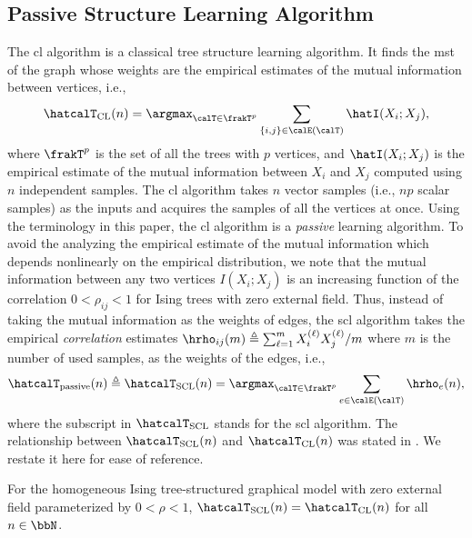 \documentclass[11pt,onecolumn]{article}
\newcommand{\Passive}{{\rm passive}}
\begin{document}
\subsection{Passive Structure Learning Algorithm}\label{sec:pasivlearn}
The \ac{cl} algorithm is a classical tree structure learning algorithm\cite{chow1968approximating}. It finds the \ac{mst} of the graph whose weights are the empirical estimates of the mutual information between vertices, i.e.,
\begin{align}
	\hatcalT_{\rm{CL}}(n)=\argmax_{\calT\in\frakT^{p}} \sum_{\{i,j\}\in\calE(\calT)} \hatI(X_{i};X_{j}),
\end{align}
where $\frakT^{p}$ is the set of all the trees with $p$ vertices, and $\hatI(X_{i};X_{j})$ is the empirical estimate of the mutual information between $X_{i}$ and $X_{j}$ computed using $n$ independent samples. The \ac{cl} algorithm takes $n$ vector samples (i.e., $np$ 
scalar samples) as the inputs and acquires the samples of all the vertices at once. Using the terminology in this paper, the \ac{cl} algorithm is a   \emph{passive} learning algorithm. To avoid the analyzing the empirical estimate 
of the mutual information which depends nonlinearly on the empirical distribution, we note that the mutual information between any two vertices $I(X_{i};X_{j})$ is an increasing function of the correlation $0<\rho_{ij}<1$ for Ising trees with zero external field. Thus, instead of taking the mutual 
information as the weights of edges, the \ac{scl} algorithm takes the empirical {\em correlation} estimates  $\hrho_{ij}(m) \triangleq \sum_{\ell=1}^{m}X_{i}^{(\ell)}X_{j}^{(\ell)}/ m$ where $m$ is the number of used samples, as the weights of the edges, i.e.,
\begin{align}\label{eq:cl}
	\hatcalT_{\Passive}(n)\triangleq\hatcalT_{\rm{SCL}}(n)=\argmax_{\calT\in\frakT^{p}} \sum_{e\in\calE(\calT)} \hrho_{e}(n),
\end{align}
where the subscript in $\hatcalT_{\rm{SCL}}$ stands for the \ac{scl} algorithm. The relationship between $\hatcalT_{\rm{SCL}}(n)$ and $\hatcalT_{\rm{CL}}(n)$ was  stated in  \cite[Lemma~A.2]{bresler2020learning}. We restate it here  for ease of reference.
\begin{proposition} \label{prop:SCL}
	For the homogeneous Ising tree-structured graphical model with zero external field  parameterized by $0<\rho<1$, $\hatcalT_{\rm{SCL}}(n)=\hatcalT_{\rm{CL}}(n)$ for all $n\in\bbN$. 
\end{proposition}

\end{document}
